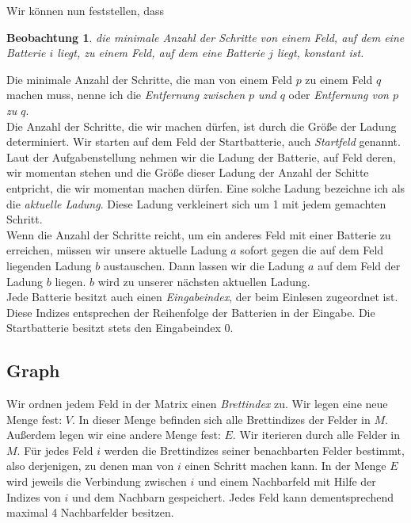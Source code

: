 \documentclass[a4paper,10pt,ngerman]{scrartcl}
\newtheorem{lemma}{Beobachtung}
\begin{document}
Wir können nun feststellen, dass
\begin{lemma}\label{observ:distances}
die minimale Anzahl der Schritte von einem Feld, auf dem eine Batterie $i$ liegt, zu einem Feld, 
auf dem eine Batterie $j$ liegt, konstant ist.
\end{lemma}

Die minimale Anzahl der Schritte, die man von einem Feld $p$ zu einem Feld $q$ machen muss, nenne
ich die \textit{Entfernung zwischen $p$ und $q$} oder \textit{Entfernung von $p$ zu $q$}.\\

Die Anzahl der Schritte, die wir machen dürfen, ist durch die Größe der Ladung determiniert.
Wir starten auf dem Feld der Startbatterie, auch \textit{Startfeld} genannt.
Laut der Aufgabenstellung nehmen wir die Ladung der Batterie, auf Feld deren, wir momentan stehen und 
die Größe dieser Ladung der Anzahl der Schitte entpricht, die wir momentan machen dürfen. 
Eine solche Ladung bezeichne ich als die \textit{aktuelle Ladung}. Diese Ladung verkleinert sich um 1
mit jedem gemachten Schritt.\\
Wenn die Anzahl der Schritte reicht, um ein anderes Feld mit einer Batterie zu erreichen, müssen wir
unsere aktuelle Ladung $a$ sofort gegen die auf dem Feld liegenden Ladung $b$ austauschen. Dann lassen
wir die Ladung $a$ auf dem Feld der Ladung $b$ liegen. $b$ wird zu unserer nächsten aktuellen Ladung.\\

Jede Batterie besitzt auch einen \textit{Eingabeindex}, der beim Einlesen zugeordnet ist.
Diese Indizes entsprechen der Reihenfolge der Batterien in der Eingabe. Die Startbatterie besitzt stets den Eingabeindex 0.\\

\subsection{Graph}
Wir ordnen jedem Feld in der Matrix einen \textit{Brettindex} zu.
Wir legen eine neue Menge fest: $V$. In dieser Menge befinden sich alle Brettindizes der Felder in $M$.
Außerdem legen wir eine andere Menge fest: $E$.
Wir iterieren durch alle Felder in $M$. Für jedes Feld $i$ werden die Brettindizes seiner benachbarten Felder bestimmt,
also derjenigen, zu denen man von $i$ einen Schritt machen kann.
In der Menge $E$ wird jeweils die Verbindung zwischen $i$ und einem Nachbarfeld mit Hilfe der Indizes von $i$ 
und dem Nachbarn gespeichert. Jedes Feld kann dementsprechend maximal 4 Nachbarfelder besitzen.\\
\end{document}
